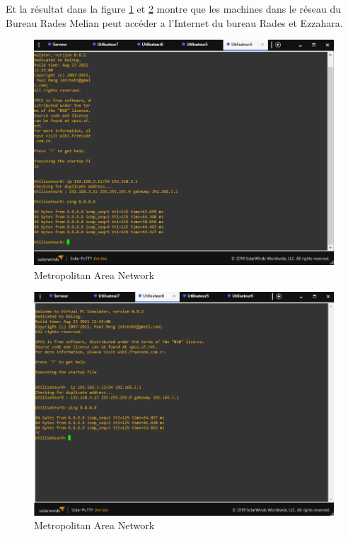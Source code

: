 Et la résultat dans la figure \ref{Chap2.4.13} et \ref{Chap2.4.14} montre que les machines dans le réseau du Bureau Rades Melian peut accéder a l'Internet du bureau Rades et Ezzahara.  \\

\begin{figure}[H]
 \centering
    \includegraphics[width=13cm]{Images/BRadesMelian-Topologie12.png}
    \caption{Metropolitan Area Network}
    \label{Chap2.4.13}
\end{figure}    
\smallskip

\begin{figure}[H]
 \centering
    \includegraphics[width=13cm]{Images/BRadesMelian-Topologie13.png}
    \caption{Metropolitan Area Network}
    \label{Chap2.4.14}
\end{figure}    
\smallskip

